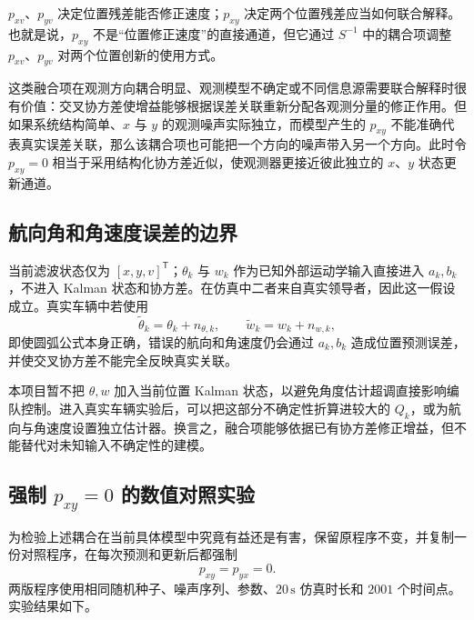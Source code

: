 \documentclass[UTF8,a4paper,11pt]{ctexart}
\newcommand{\transpose}{^{\mathsf T}}
\begin{document}
\begin{keybox}
$p_{xv}$、$p_{yv}$ 决定位置残差能否修正速度；$p_{xy}$ 决定两个位置残差应当如何联合解释。也就是说，$p_{xy}$ 不是“位置修正速度”的直接通道，但它通过 $S^{-1}$ 中的耦合项调整 $p_{xv}$、$p_{yv}$ 对两个位置创新的使用方式。
\end{keybox}

这类融合项在观测方向耦合明显、观测模型不确定或不同信息源需要联合解释时很有价值：交叉协方差使增益能够根据误差关联重新分配各观测分量的修正作用。但如果系统结构简单、$x$ 与 $y$ 的观测噪声实际独立，而模型产生的 $p_{xy}$ 不能准确代表真实误差关联，那么该耦合项也可能把一个方向的噪声带入另一个方向。此时令 $p_{xy}=0$ 相当于采用结构化协方差近似，使观测器更接近彼此独立的 $x$、$y$ 状态更新通道。

\subsection{航向角和角速度误差的边界}

当前滤波状态仅为 $[x,y,v]\transpose$；$\theta_k$ 与 $w_k$ 作为已知外部运动学输入直接进入 $a_k,b_k$，不进入 Kalman 状态和协方差。在仿真中二者来自真实领导者，因此这一假设成立。真实车辆中若使用
\begin{equation}
\widetilde\theta_k=\theta_k+n_{\theta,k},
\qquad
\widetilde w_k=w_k+n_{w,k},
\end{equation}
即使圆弧公式本身正确，错误的航向和角速度仍会通过 $a_k,b_k$ 造成位置预测误差，并使交叉协方差不能完全反映真实关联。

本项目暂不把 $\theta,w$ 加入当前位置 Kalman 状态，以避免角度估计超调直接影响编队控制。进入真实车辆实验后，可以把这部分不确定性折算进较大的 $Q_k$，或为航向与角速度设置独立估计器。换言之，融合项能够依据已有协方差修正增益，但不能替代对未知输入不确定性的建模。

\subsection{强制 \texorpdfstring{$p_{xy}=0$}{pxy=0} 的数值对照实验}

为检验上述耦合在当前具体模型中究竟有益还是有害，保留原程序不变，并复制一份对照程序，在每次预测和更新后都强制
\begin{equation}
p_{xy}=p_{yx}=0.
\end{equation}
两版程序使用相同随机种子、噪声序列、参数、$20\,\mathrm{s}$ 仿真时长和 $2001$ 个时间点。实验结果如下。
\end{document}
